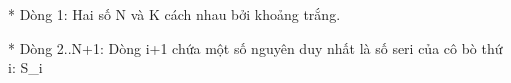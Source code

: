 * Dòng 1: Hai số N và K cách nhau bởi khoảng trắng.  

   * Dòng 2..N+1: Dòng i+1 chứa một số nguyên duy nhất là số seri của cô bò thứ i: S\_i  

\